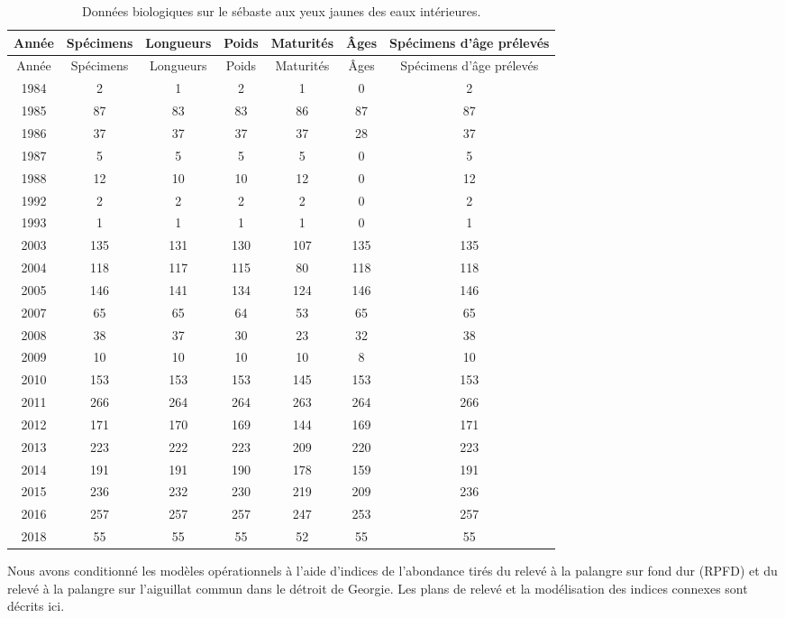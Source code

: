 \documentclass[french,11pt]{book}
\begin{document}
\hypertarget{tableau-ruxe9capitulatif-des-donnuxe9es-biologiques-accessibles}{%
\label{tableau-ruxe9capitulatif-des-donnuxe9es-biologiques-accessibles}}
\begin{longtable}[]{@{}ccccccc@{}}
\caption{\label{tab:test}Données biologiques sur le sébaste aux yeux jaunes des eaux intérieures.}\tabularnewline
\toprule
Année & Spécimens & Longueurs & Poids & Maturités & Âges & Spécimens d'âge prélevés\tabularnewline
\midrule
\endfirsthead
\toprule
Année & Spécimens & Longueurs & Poids & Maturités & Âges & Spécimens d'âge prélevés\tabularnewline
\midrule
\endhead
1984 & 2 & 1 & 2 & 1 & 0 & 2\tabularnewline
1985 & 87 & 83 & 83 & 86 & 87 & 87\tabularnewline
1986 & 37 & 37 & 37 & 37 & 28 & 37\tabularnewline
1987 & 5 & 5 & 5 & 5 & 0 & 5\tabularnewline
1988 & 12 & 10 & 10 & 12 & 0 & 12\tabularnewline
1992 & 2 & 2 & 2 & 2 & 0 & 2\tabularnewline
1993 & 1 & 1 & 1 & 1 & 0 & 1\tabularnewline
2003 & 135 & 131 & 130 & 107 & 135 & 135\tabularnewline
2004 & 118 & 117 & 115 & 80 & 118 & 118\tabularnewline
2005 & 146 & 141 & 134 & 124 & 146 & 146\tabularnewline
2007 & 65 & 65 & 64 & 53 & 65 & 65\tabularnewline
2008 & 38 & 37 & 30 & 23 & 32 & 38\tabularnewline
2009 & 10 & 10 & 10 & 10 & 8 & 10\tabularnewline
2010 & 153 & 153 & 153 & 145 & 153 & 153\tabularnewline
2011 & 266 & 264 & 264 & 263 & 264 & 266\tabularnewline
2012 & 171 & 170 & 169 & 144 & 169 & 171\tabularnewline
2013 & 223 & 222 & 223 & 209 & 220 & 223\tabularnewline
2014 & 191 & 191 & 190 & 178 & 159 & 191\tabularnewline
2015 & 236 & 232 & 230 & 219 & 209 & 236\tabularnewline
2016 & 257 & 257 & 257 & 247 & 253 & 257\tabularnewline
2018 & 55 & 55 & 55 & 52 & 55 & 55\tabularnewline
\bottomrule
\end{longtable}
\clearpage


\clearpage

\label{app:index-data}

Nous avons conditionné les modèles opérationnels à l'aide d'indices de l'abondance tirés du relevé à la palangre sur fond dur (RPFD) et du relevé à la palangre sur l'aiguillat commun dans le détroit de Georgie. Les plans de relevé et la modélisation des indices connexes sont décrits ici.

\hypertarget{sec:hbll-index-data}{%
\label{sec:hbll-index-data}}
\end{document}
